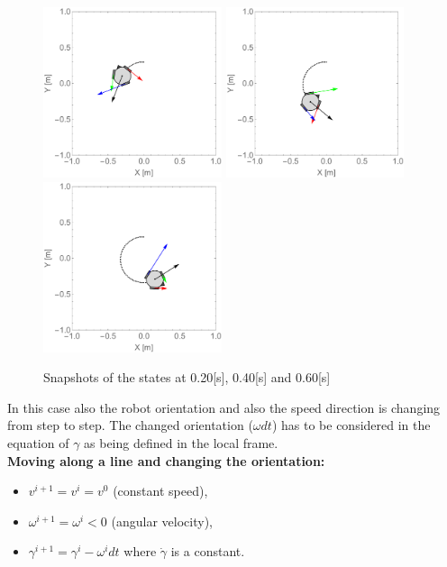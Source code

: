 \documentclass[12pt,english,twoside]{article}
\begin{document}
\begin{figure}[htb!]
	\centering
	\includegraphics[height=5cm]{figures/2d_simulation/animations2/2D_move_along_circle_rotating_reverse_direction/20}
	\endminipage\hfill
	\centering
	\includegraphics[height=5cm]{figures/2d_simulation/animations2/2D_move_along_circle_rotating_reverse_direction/40}
	\endminipage\hfill
	\centering
	\includegraphics[height=5cm]{figures/2d_simulation/animations2/2D_move_along_circle_rotating_reverse_direction/60}
	\endminipage\hfill
	\caption{Snapshots of the states at 0.20[s], 0.40[s] and 0.60[s]}
\end{figure}
In this case also the robot orientation and also the speed direction is changing from step to step. The changed orientation ($\omega dt$) has to be considered in the equation of $\gamma$ as being defined in the local frame.\\[0.3cm] 
\noindent \textbf{Moving along a line and changing the orientation:}
\begin{itemize}
	\item $v^{i+1} = v^{i} = v^{0}$ (constant speed),
	\item $\omega^{i+1} = \omega^{i}<0$ (angular velocity),
	\item $\gamma^{i+1} = \gamma^i -\omega^i dt$ where $\dot \gamma$ is a constant.
\end{itemize}
\end{document}
